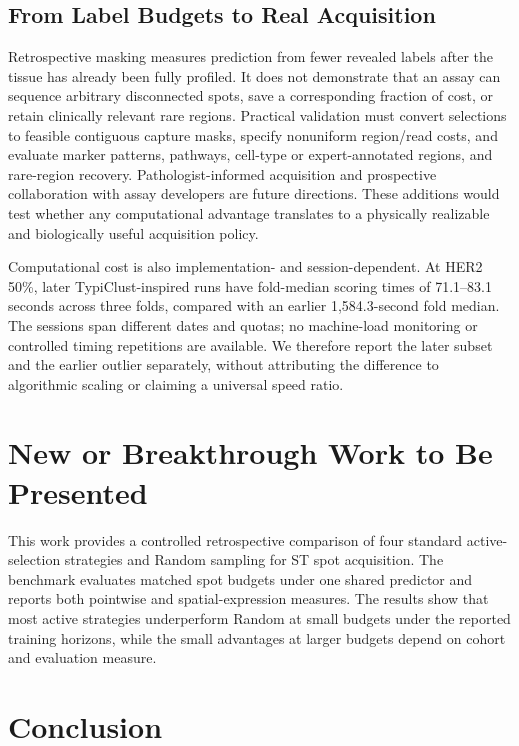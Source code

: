 \documentclass[]{spie}
\begin{document}
\subsection{From Label Budgets to Real Acquisition}

Retrospective masking measures prediction from fewer revealed labels after the tissue has already been fully profiled. It does not demonstrate that an assay can sequence arbitrary disconnected spots, save a corresponding fraction of cost, or retain clinically relevant rare regions. Practical validation must convert selections to feasible contiguous capture masks, specify nonuniform region/read costs, and evaluate marker patterns, pathways, cell-type or expert-annotated regions, and rare-region recovery. Pathologist-informed acquisition and prospective collaboration with assay developers are future directions. These additions would test whether any computational advantage translates to a physically realizable and biologically useful acquisition policy.

Computational cost is also implementation- and session-dependent. At HER2 50\%, later TypiClust-inspired runs have fold-median scoring times of 71.1--83.1 seconds across three folds, compared with an earlier 1,584.3-second fold median. The sessions span different dates and quotas; no machine-load monitoring or controlled timing repetitions are available. We therefore report the later subset and the earlier outlier separately, without attributing the difference to algorithmic scaling or claiming a universal speed ratio.

\section{New or Breakthrough Work to Be Presented}

This work provides a controlled retrospective comparison of four standard active-selection strategies and Random sampling for ST spot acquisition. The benchmark evaluates matched spot budgets under one shared predictor and reports both pointwise and spatial-expression measures. The results show that most active strategies underperform Random at small budgets under the reported training horizons, while the small advantages at larger budgets depend on cohort and evaluation measure.

\section{Conclusion}
\end{document}
